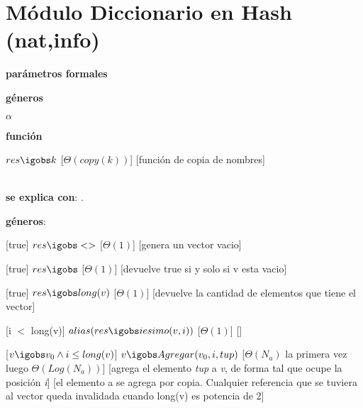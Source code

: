 \section{Módulo Diccionario en Hash (nat,info)}

\begin{Interfaz}
  \textbf{parámetros formales}\parindent\\
  \parbox{1.7cm}{\textbf{géneros}}$\alpha$\\
  \parbox[t]{1.7cm}{\textbf{función}}\parbox[t]{.5\textwidth-\parindent-1.7cm}{%
    {$res \igobs k$}
    [$\Theta(copy(k))$]
    [función de copia de nombres]
  }\\
   	
  \textbf{se explica con}: .

  \textbf{géneros}: 


    

  
  [true]
  {$res \igobs <>$}
  [$\Theta(1)$]
  [genera un vector vacio]
  
  [true]
  {$res \igobs $}
  [$\Theta(1)$]
  [devuelve true si y solo si v esta vacio]
    
  [true]
  {$res \igobs long(v)$}
  [$\Theta(1)$]
  [devuelve la cantidad de elementos que tiene el vector]
    
  [i $<$ long(v)]
  {$alias(res \igobs iesimo(v, i))$}
  [$\Theta(1)$]
  []
  
  
  
  [$v \igobs v_0 \land i \leq long(v) $]
  {$v \igobs Agregar(v_0,i,tup) $}
  [$\Theta(N_{a})$ la primera vez luego $ \Theta(Log(N_{a})) $]
  [agrega el elemento \textit{tup} a \textit{v}, de forma tal que ocupe la posición \textit{i}]  
 [el elemento a se agrega por copia. Cualquier referencia que se tuviera al vector queda invalidada cuando
long(v) es potencia de 2]

\end{Interfaz}

